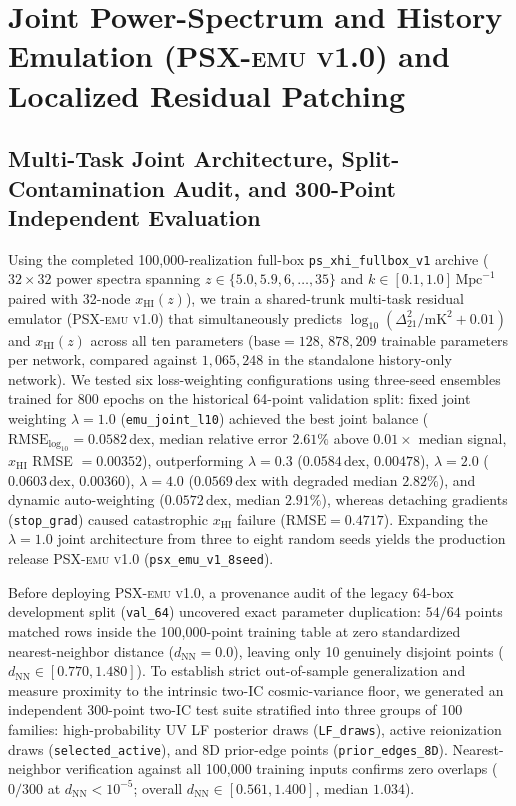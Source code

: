 \documentclass[aps,prd,reprint,superscriptaddress,nofootinbib,amsmath,amssymb,floatfix,longbibliography]{revtex4-2}
\begin{document}
\section{Joint Power-Spectrum and History Emulation (\texorpdfstring{\textsc{PSX-emu v1.0}}{PSX-emu v1.0}) and Localized Residual Patching}\label{sec:psx_emu}

\subsection{Multi-Task Joint Architecture, Split-Contamination Audit, and 300-Point Independent Evaluation}\label{sec:psx_audit}

Using the completed 100,000-realization full-box \texttt{ps\_xhi\_fullbox\_v1} archive ($32 \times 32$ power spectra spanning $z \in \{5.0, 5.9, 6, \dots, 35\}$ and $k \in [0.1, 1.0]\,\mathrm{Mpc}^{-1}$ paired with 32-node $x_{\mathrm{HI}}(z)$), we train a shared-trunk multi-task residual emulator (\textsc{PSX-emu v1.0}) that simultaneously predicts $\log_{10}(\Delta^2_{21}/\mathrm{mK}^2 + 0.01)$ and $x_{\mathrm{HI}}(z)$ across all ten parameters ($\mathrm{base}=128$, $878{,}209$ trainable parameters per network, compared against $1{,}065{,}248$ in the standalone history-only network). We tested six loss-weighting configurations using three-seed ensembles trained for $800$ epochs on the historical 64-point validation split: fixed joint weighting $\lambda=1.0$ (\texttt{emu\_joint\_l10}) achieved the best joint balance ($\mathrm{RMSE}_{\log_{10}} = 0.0582\,\mathrm{dex}$, median relative error $2.61\%$ above $0.01\times$ median signal, $x_{\mathrm{HI}}$ RMSE $= 0.00352$), outperforming $\lambda=0.3$ ($0.0584\,\mathrm{dex}$, $0.00478$), $\lambda=2.0$ ($0.0603\,\mathrm{dex}$, $0.00360$), $\lambda=4.0$ ($0.0569\,\mathrm{dex}$ with degraded median $2.82\%$), and dynamic auto-weighting ($0.0572\,\mathrm{dex}$, median $2.91\%$), whereas detaching gradients (\texttt{stop\_grad}) caused catastrophic $x_{\mathrm{HI}}$ failure ($\mathrm{RMSE}=0.4717$). Expanding the $\lambda=1.0$ joint architecture from three to eight random seeds yields the production release \textsc{PSX-emu v1.0} (\texttt{psx\_emu\_v1\_8seed}).

Before deploying \textsc{PSX-emu v1.0}, a provenance audit of the legacy 64-box development split (\texttt{val\_64}) uncovered exact parameter duplication: $54/64$ points matched rows inside the 100,000-point training table at zero standardized nearest-neighbor distance ($d_{\mathrm{NN}} = 0.0$), leaving only 10 genuinely disjoint points ($d_{\mathrm{NN}} \in [0.770, 1.480]$). To establish strict out-of-sample generalization and measure proximity to the intrinsic two-IC cosmic-variance floor, we generated an independent 300-point two-IC test suite stratified into three groups of 100 families: high-probability UV LF posterior draws (\texttt{LF\_draws}), active reionization draws (\texttt{selected\_active}), and 8D prior-edge points (\texttt{prior\_edges\_8D}). Nearest-neighbor verification against all 100,000 training inputs confirms zero overlaps ($0/300$ at $d_{\mathrm{NN}} < 10^{-5}$; overall $d_{\mathrm{NN}} \in [0.561, 1.400]$, median $1.034$).
\end{document}
